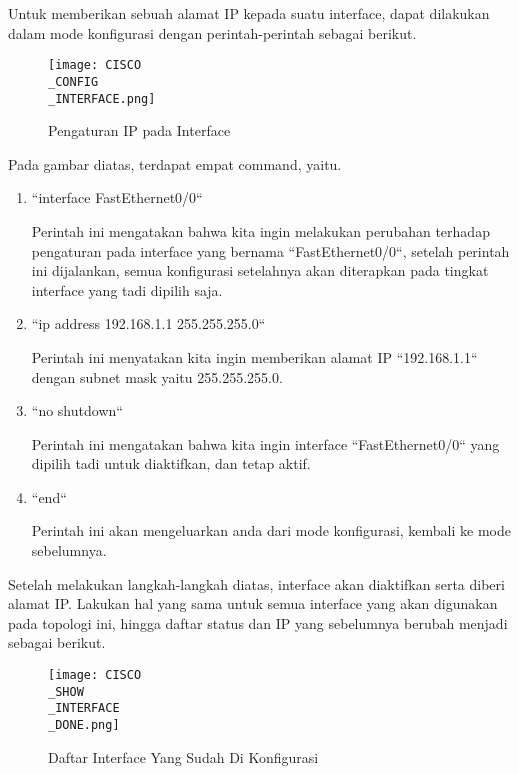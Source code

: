 \documentclass[12pt, a4paper]{article}
\begin{document}
  Untuk memberikan sebuah alamat IP kepada suatu interface, dapat dilakukan
  dalam mode konfigurasi dengan perintah-perintah sebagai berikut.

  \begin{figure}[h]
      \centering
      \texttt{[image: CISCO\\\_CONFIG\\\_INTERFACE.png]}
      \caption{\small{Pengaturan IP pada Interface}}
  \end{figure}

  Pada gambar diatas, terdapat empat command, yaitu.

  \begin{enumerate}
    \item ``interface FastEthernet0/0``

      Perintah ini mengatakan bahwa kita ingin melakukan perubahan terhadap 
      pengaturan pada interface yang bernama ``FastEthernet0/0``, setelah
      perintah ini dijalankan, semua konfigurasi setelahnya akan diterapkan
      pada tingkat interface yang tadi dipilih saja.

    \item ``ip address 192.168.1.1 255.255.255.0``

      Perintah ini menyatakan kita ingin memberikan alamat IP ``192.168.1.1``
      dengan subnet mask yaitu 255.255.255.0.

    \item ``no shutdown``

      Perintah ini mengatakan bahwa kita ingin interface ``FastEthernet0/0``
      yang dipilih tadi untuk diaktifkan, dan tetap aktif.

    \item ``end``

      Perintah ini akan mengeluarkan anda dari mode konfigurasi, kembali
      ke mode sebelumnya.

  \end{enumerate}

  \newpage

  Setelah melakukan langkah-langkah diatas, interface akan diaktifkan serta diberi
  alamat IP. Lakukan hal yang sama untuk semua interface yang akan digunakan
  pada topologi ini, hingga daftar status dan IP yang sebelumnya berubah
  menjadi sebagai berikut.

  \begin{figure}[h]
      \centering
      \texttt{[image: CISCO\\\_SHOW\\\_INTERFACE\\\_DONE.png]}
      \caption{\small{Daftar Interface Yang Sudah Di Konfigurasi}}
  \end{figure}
\end{document}
